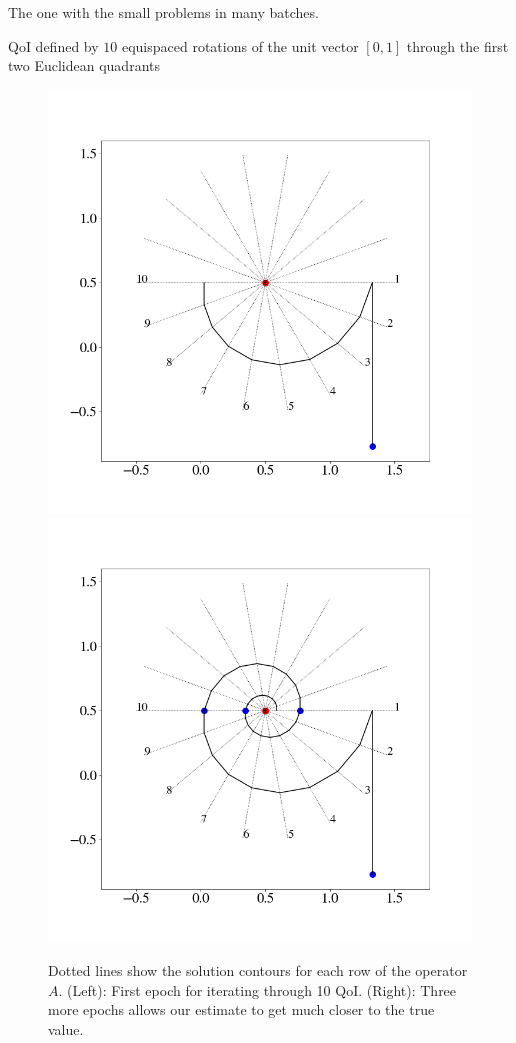 \begin{frame}[t]

The one with the small problems in many batches.

QoI defined by $10$ equispaced rotations of the unit vector $[0, 1]$ through the first two Euclidean quadrants

\begin{figure}
  \centering
  \includegraphics[width=0.475\linewidth]{figures/iterative/10D-firstepoch.png}
  \includegraphics[width=0.475\linewidth]{figures/iterative/10D-fewepochs.png}

  \caption{
  Dotted lines show the solution contours for each row of the operator $A$.
  (Left): First epoch for iterating through 10 QoI.
  (Right): Three more epochs allows our estimate to get much closer to the true value.
  }
  \label{fig:iterative-linear-demo}
\end{figure}

\end{frame}

